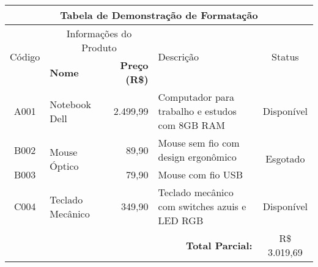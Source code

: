 \documentclass{standalone}
\begin{document}
\centering
\begin{tabular}{|c|l|r|p{3cm}|c|}

    \hline
    
    \multicolumn{5}{|c|}{\textbf{Tabela de Demonstração de Formatação}} \\
    \hline
    
    \multirow{2}{*}{Código} &  \multicolumn{2}{c|}{Informações do Produto} & \multirow{2}{*}{Descrição} & \multirow{2}{*}{Status} \\
    
    \cline{2-3}
    
    & \textbf{Nome} & \textbf{Preço (R\$)} & & \\
    \hline
    
    \hline
    A001 & Notebook Dell & 2.499,99 & Computador para trabalho e estudos com 8GB RAM & 
    Disponível \\
    
    \hline
    
    B002 & \multirow{2}{*}{Mouse Óptico} & 89,90 & 
    Mouse sem fio com design ergonômico & \multirow{2}{*}{Esgotado} \\
    \cline{1-1}\cline{3-4}
    
    B003 & & 79,90 & 
    Mouse com fio USB & \\
    \hline
    
    C004 & Teclado Mecânico & 349,90 & 
    Teclado mecânico com switches azuis e LED RGB & 
    Disponível \\
    \hline
    
    \multicolumn{4}{|r|}{\textbf{Total Parcial:}} & R\$ 3.019,69 \\
    
    \hline
\end{tabular}
\end{document}
